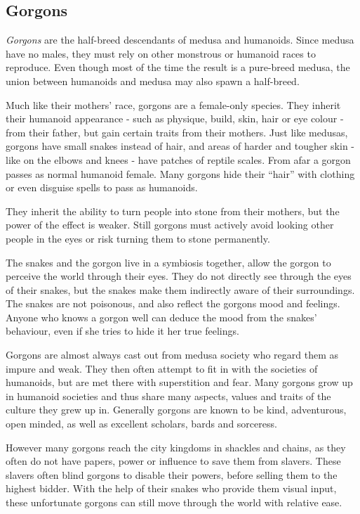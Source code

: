\subsection{Gorgons}
\label{sec:Gorgons}

\emph{Gorgons} are the half-breed descendants of medusa and humanoids. Since
medusa have no males, they must rely on other monstrous or humanoid races to
reproduce. Even though most of the time the result is a pure-breed medusa, the
union between humanoids and medusa may also spawn a half-breed.

Much like their mothers' race, gorgons are a female-only species. They
inherit their humanoid appearance - such as physique, build, skin, hair or eye
colour - from their father, but gain certain traits from their mothers. Just
like medusas, gorgons have small snakes instead of hair, and areas of harder
and tougher skin - like on the elbows and knees - have patches of reptile
scales. From afar a gorgon passes as normal humanoid female. Many gorgons hide
their ``hair'' with clothing or even disguise spells to pass as humanoids.

They inherit the ability to turn people into stone from their mothers, but
the power of the effect is weaker. Still gorgons must actively avoid looking
other people in the eyes or risk turning them to stone permanently.

The snakes and the gorgon live in a symbiosis together, allow the gorgon to
perceive the world through their eyes. They do not directly see through the
eyes of their snakes, but the snakes make them indirectly aware of their
surroundings. The snakes are not poisonous, and also reflect the gorgons mood
and feelings. Anyone who knows a gorgon well can deduce the mood from the
snakes' behaviour, even if she tries to hide it her true feelings.

Gorgons are almost always cast out from medusa society who regard them as impure
and weak. They then often attempt to fit in with the societies of humanoids,
but are met there with superstition and fear. Many gorgons grow up in humanoid
societies and thus share many aspects, values and traits of the culture they
grew up in. Generally gorgons are known to be kind, adventurous, open minded,
as well as excellent scholars, bards and sorceress.

However many gorgons reach the city kingdoms in shackles and chains, as they
often do not have papers, power or influence to save them from slavers. These
slavers often blind gorgons to disable their powers, before selling them to the
highest bidder. With the help of their snakes who provide them visual input,
these unfortunate gorgons can still move through the world with relative ease.

